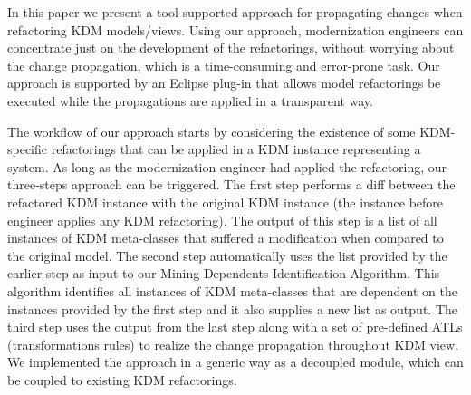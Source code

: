 In this paper we present a tool-supported approach for propagating changes when refactoring KDM models/views. Using our approach, modernization engineers can concentrate just on the development of the refactorings, without worrying about the change propagation, which is a time-consuming and error-prone task. Our approach is supported by an Eclipse plug-in that allows model refactorings be executed while the propagations are applied in a transparent way.


The workflow of our approach starts by considering the existence of some KDM-specific refactorings that can be applied in a KDM instance representing a system. As long as the modernization engineer had applied the refactoring, our three-steps approach can be triggered. The first step performs a diff between the refactored KDM instance with the original KDM instance (the instance before engineer applies any KDM refactoring). The output of this step is a list of all instances of KDM meta-classes that suffered a modification when compared to the original model. The second step automatically uses the list provided by the earlier step as input to our Mining Dependents Identification Algorithm. This algorithm identifies all instances of KDM meta-classes that are dependent on the instances provided by the first step and it also supplies a new list as output.
%
%
%
The third step uses the output from the last step along with a set of pre-defined ATLs (transformations rules) to realize the change propagation throughout KDM view. We implemented the approach in a generic way as a decoupled module, which can be coupled to existing KDM refactorings. 



